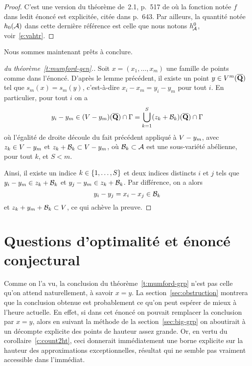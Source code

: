 \begin{proof}
  C'est une version du théorème de~2.1, p.~517 de \cite{remdcl} où la fonction
  notée \( f \) dans ledit énoncé est explicitée, citée dans \cite{daphimhva2}
  p.~643. Par ailleurs, la quantité notée \( h_0(\mathcal A) \) dans cette dernière
  référence est celle que nous notons \( h^{0}_{\!\mathcal A} \), voir~\eqref{e:vahtr}.
\end{proof}

Nous sommes maintenant prêts à conclure.

\begin{proof}[\proofname{} du théorème~\vref{t:mumford-gen}.]
  Soit \( x = (x_1, \dots, x_m) \) une famille de points comme dans l'énoncé.
  D'après le lemme précédent, il existe un point \( y \in V^m(\overline{{\mathbf{Q}}}) \)
  tel que \( s_m(x) = s_m(y) \), c'est-à-dire \( x_i - x_m = y_i - y_m \) pour
  tout \( i \). En particulier, pour tout \( i \) on a
  \begin{equation}
    y_i - y_m
    \in
    (V - y_m)(\overline{{\mathbf{Q}}}) \cap \Gamma
    =
    \bigcup_{k=1}^{S} (z_k + \mathcal B_k)(\overline{{\mathbf{Q}}}) \cap \Gamma
  \end{equation}
  où l'égalité de droite découle du fait précédent appliqué à \( V - y_m
  \), avec \( z_k \in V - y_m \) et \( z_k + \mathcal B_k \subset V - y_m
  \), où \( \mathcal B_k \subset \mathcal A \) est une sous-variété abélienne, pour tout \(
    k \), et \( S < m \).

  Ainsi, il existe un indice \( k \in \lbrace1, \dots, S\rbrace \) et deux indices
  distincts \( i \) et \( j \) tels que \( y_i - y_m \in z_k + \mathcal B_k \) et \(
    y_j - y_m \in z_k + \mathcal B_k \). Par différence, on a alors
  \begin{equation}
    y_i - y_j = x_i - x_j \in \mathcal B_k
  \end{equation}
  et \( z_k + y_m + \mathcal B_k \subset V \), ce qui achève la preuve.
\end{proof}



\section{Questions d'optimalité et énoncé conjectural}
\label{sec:mum-conj}

Comme on l'a vu, la conclusion du théorème~\vref{t:mumford-grp} n'est pas
celle qu'on attend naturellement, à savoir \( x = y \). La
section~\vref{sec:obstruction} montrera que la conclusion obtenue est
probablement ce qu'on peut espérer de mieux à l'heure actuelle. En effet, si
dans cet énoncé on pouvait remplacer la conclusion par \( x = y \), alors en
suivant la méthode de la section~\vref{sec:big-grp} on aboutirait à un
décompte explicite des points de hauteur assez grande. Or, en vertu du
corollaire~\vref{c:count2ht}, ceci donnerait immédiatement une borne explicite
sur la hauteur des approximations exceptionnelles, résultat qui ne semble pas
vraiment accessible dans l'immédiat.

